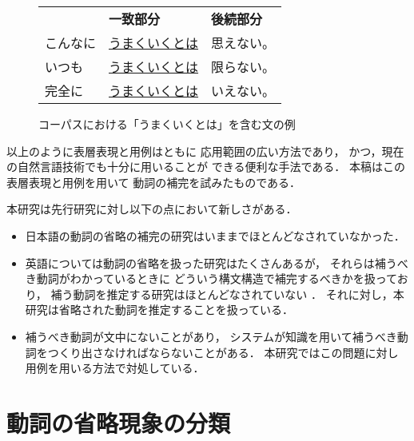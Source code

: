 \begin{figure}[t]
  \begin{center}
  \begin{tabular}[t]{lll}
 & {\bf 一致部分} & {\bf 後続部分}\\[0.2cm]
こんなに & \underline{うまくいくとは} & 思えない。 \\
いつも & \underline{うまくいくとは} & 限らない。\\
完全に & \underline{うまくいくとは} & いえない。\\
\end{tabular}
  \end{center}
\caption{コーパスにおける「うまくいくとは」を含む文の例}
\label{tab:how_to_use_corpus}
\end{figure}

以上のように表層表現と用例はともに
応用範囲の広い方法であり，
かつ，現在の自然言語技術でも十分に用いることが
できる便利な手法である．
本稿はこの表層表現と用例を用いて
動詞の補完を試みたものである．

本研究は先行研究に対し以下の点において新しさがある．
\begin{itemize}
\item 
日本語の動詞の省略の補完の研究はいままでほとんどなされていなかった．

\item 
英語については動詞の省略を扱った研究はたくさんあるが，
それらは補うべき動詞がわかっているときに
どういう構文構造で補完するべきかを扱っており，
補う動詞を推定する研究はほとんどなされていない
\cite{Dalrymple91}\cite{Kehler93}\cite{Lappin96}．
それに対し，本研究は省略された動詞を推定することを扱っている．

\item 
補うべき動詞が文中にないことがあり，
システムが知識を用いて補うべき動詞をつくり出さなければならないことがある．
本研究ではこの問題に対し用例を用いる方法で対処している．
\end{itemize}


\section{動詞の省略現象の分類}
\label{sec:bunrui}

\begin{figure}[t]
  \vspace{-2.5mm}
  \begin{center}
  \end{center}
  \vspace{-2.5mm}
\end{figure}

